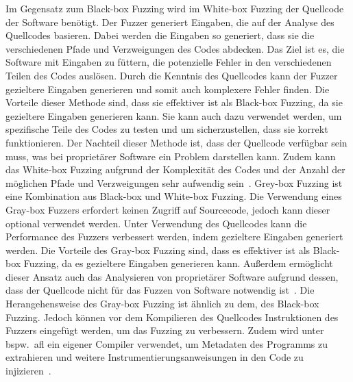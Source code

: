 Im Gegensatz zum Black-box Fuzzing wird im White-box Fuzzing der Quellcode der Software benötigt.
Der Fuzzer generiert Eingaben, die auf der Analyse des Quellcodes basieren.
Dabei werden die Eingaben so generiert, dass sie die verschiedenen Pfade und Verzweigungen des Codes abdecken.
Das Ziel ist es, die Software mit Eingaben zu füttern, die potenzielle Fehler in den verschiedenen Teilen des Codes auslösen.
Durch die Kenntnis des Quellcodes kann der Fuzzer gezieltere Eingaben generieren und somit auch komplexere Fehler finden.
Die Vorteile dieser Methode sind, dass sie effektiver ist als Black-box Fuzzing, da sie gezieltere Eingaben generieren kann.
Sie kann auch dazu verwendet werden, um spezifische Teile des Codes zu testen und um sicherzustellen, dass sie korrekt funktionieren.
Der Nachteil dieser Methode ist, dass der Quellcode verfügbar sein muss, was bei proprietärer Software ein Problem darstellen kann.
Zudem kann das White-box Fuzzing aufgrund der Komplexität des Codes und der Anzahl der möglichen Pfade und Verzweigungen
sehr aufwendig sein~\cite{black-box-fuzzing}.\newline\newline
Grey-box Fuzzing ist eine Kombination aus Black-box und White-box Fuzzing.
Die Verwendung eines Gray-box Fuzzers erfordert keinen Zugriff auf Sourcecode, jedoch kann dieser optional verwendet werden.
Unter Verwendung des Quellcodes kann die Performance des Fuzzers verbessert werden, indem gezieltere Eingaben generiert werden.
Die Vorteile des Gray-box Fuzzing sind, dass es effektiver ist als Black-box Fuzzing, da es gezieltere Eingaben generieren kann.
Außerdem ermöglicht dieser Ansatz auch das Analysieren von proprietärer Software aufgrund dessen, dass der Quellcode nicht für das
Fuzzen von Software notwendig ist~\cite{grey-box-fuzzing}.
Die Herangehensweise des Gray-box Fuzzing ist ähnlich zu dem, des Black-box Fuzzing.
Jedoch können vor dem Kompilieren des Quellcodes Instruktionen des Fuzzers eingefügt werden, um das Fuzzing zu verbessern.
Zudem wird unter bspw.\ \gls{afl} ein eigener Compiler verwendet, um Metadaten des Programms zu extrahieren und weitere
Instrumentierungsanweisungen in den Code zu injizieren~\cite{afl-instr}.